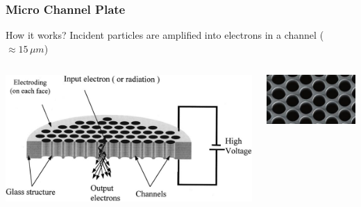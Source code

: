\begin{frame}
  \frametitle{Micro Channel Plate}
  \begin{block}{How it works?}
    Incident particles are amplified into electrons in a channel ($\approx 15\,\mu m$)
  \end{block}

  \begin{columns}[T]
    \begin{column}{0.45\textwidth}
      \begin{center}
        \includegraphics[width=1\textwidth]{03_SIM/fig/fig00_MCP_outline}
      \end{center}
    \end{column}
    \begin{column}{0.45\textwidth}
      \begin{center}
        \includegraphics[width=1\textwidth]{03_SIM/fig/fig000_MCP_outline_b2}
      \end{center}
    \end{column}
  \end{columns}


\end{frame}
